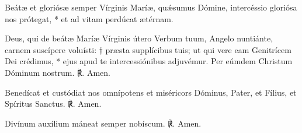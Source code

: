 \vfill


\pagebreak

\kyrieEleison
\vspace{5mm}

\vfill


\dominusVobiscum

\vfill


Beátæ et gloriósæ semper Vírginis Maríæ, quǽsumus Dómine,
intercéssio gloriósa nos prótegat, *
et ad vitam perdúcat ætérnam. \hspace{0.5cm} \perDominum



Deus, qui de beátæ Maríæ Vírginis útero Verbum tuum,
Angelo nuntiánte, carnem suscípere voluísti: †
præsta supplícibus tuis; ut qui vere eam Genitrícem Dei crédimus, *
ejus apud te intercessiónibus adjuvémur.
Per eúmdem Christum Dóminum nostrum. 
℟. Amen.

\vfill

\dominusVobiscumRep

\benedicamusDomino

\vspace{5mm}

Benedícat et custódiat nos
omnípotens et miséricors Dóminus,
Pater, et Fílius, et Spíritus Sanctus.
℟. Amen.

\vspace{5mm}
\label{antiphonaefinales}


\vspace{5mm}

Divínum auxílium máneat semper nobíscum.
℟. Amen.

\vfill


\pagebreak




